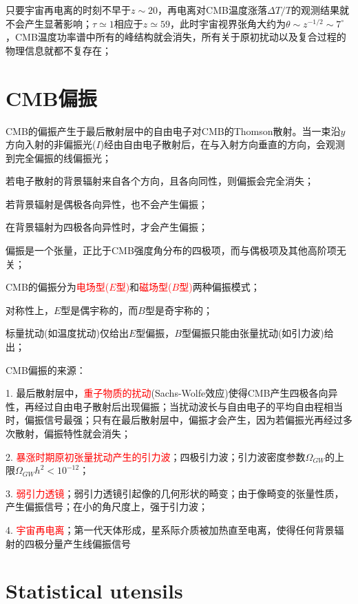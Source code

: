 \documentclass[12pt,a4paper]{article}
\begin{document}
只要宇宙再电离的时刻不早于$z \sim 20$，再电离对CMB温度涨落$\Delta T/T$的观测结果就不会产生显著影响；$\tau \simeq1$相应于$z \simeq 59$，此时宇宙视界张角大约为$\theta \sim z^{-1/2} \sim 7^{\circ}$，CMB温度功率谱中所有的峰结构就会消失，所有关于原初扰动以及复合过程的物理信息就都不复存在；

\section{CMB偏振}
CMB的偏振产生于最后散射层中的自由电子对CMB的Thomson散射。当一束沿$y$方向入射的非偏振光($I$)经由自由电子散射后，在与入射方向垂直的方向，会观测到完全偏振的线偏振光；

若电子散射的背景辐射来自各个方向，且各向同性，则偏振会完全消失；

若背景辐射是偶极各向异性，也不会产生偏振；

在背景辐射为四极各向异性时，才会产生偏振；

偏振是一个张量，正比于CMB强度角分布的四极项，而与偶极项及其他高阶项无关；

CMB的偏振分为\textcolor{red}{电场型($E$型)}和\textcolor{red}{磁场型($B$型)}两种偏振模式；

对称性上，$E$型是偶宇称的，而$B$型是奇宇称的；

标量扰动(如温度扰动)仅给出$E$型偏振，$B$型偏振只能由张量扰动(如引力波)给出；

CMB偏振的来源：

1. 最后散射层中，\textcolor{red}{重子物质的扰动}(Sachs-Wolfe效应)使得CMB产生四极各向异性，再经过自由电子散射后出现偏振；当扰动波长与自由电子的平均自由程相当时，偏振信号最强；只有在最后散射层中，偏振才会产生，因为若偏振光再经过多次散射，偏振特性就会消失；

2. \textcolor{red}{暴涨时期原初张量扰动产生的引力波}；四极引力波；引力波密度参数$\Omega_{GW}$的上限$\Omega_{GW} h^2 < 10^{-12}$；

3. \textcolor{red}{弱引力透镜}；弱引力透镜引起像的几何形状的畸变；由于像畸变的张量性质，产生偏振信号；在小的角尺度上，强于引力波；

4. \textcolor{red}{宇宙再电离}；第一代天体形成，星系际介质被加热直至电离，使得任何背景辐射的四极分量产生线偏振信号


\section{Statistical utensils}
\end{document}
